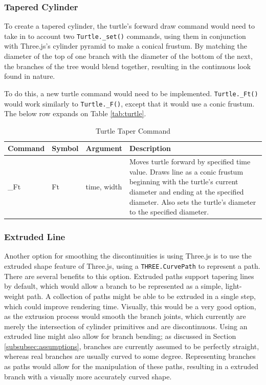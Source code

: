 \documentclass{article}
\newcommand{\tab}{\hspace*{2em}}
\begin{document}
            \subsubsection{Tapered Cylinder}
    \tab To create a tapered cylinder, the turtle's forward draw command would need to take in to
account two \verb|Turtle._set()| commands, using them in conjunction with Three.js's cylinder
pyramid to make a conical frustum. By matching the diameter of the top of one branch with the
diameter of the bottom of the next, the branches of the tree would blend together, resulting in the
continuous look found in nature.

    \tab To do this, a new turtle command would need to be implemented. \verb|Turtle._Ft()| would
work similarly to \verb|Turtle._F()|, except that it would use a conic frustum. The below row
expands on Table \ref{tab:turtle}.
\begin{table}[h]
\centering
\begin{tabular}{|l|l|l|p{7cm}|}
    \hline
    Command & Symbol & Argument & Description \\ \hline \hline
    \_Ft & Ft & time, width & Moves turtle forward by specified time value. Draws line as a conic
frustum beginning with the turtle's current diameter and ending at the specified diameter. Also
sets the turtle's diameter to the specified diameter.\\ \hline
\end{tabular}
\caption[Taper Command]{Turtle Taper Command}
\label{tab:taper}
\end{table}

            \subsubsection{Extruded Line}
    \tab Another option for smoothing the discontinuities is using Three.js is to use the extruded
shape feature of Three.js, using a \verb|THREE.CurvePath| to represent a path. There are several
benefits to this option. Extruded paths support tapering lines by default, which would allow a
branch to be represented as a simple, light-weight path. A collection of paths might be able to be
extruded in a single step, which could improve rendering time. Visually, this would be a very good
option, as the extrusion process would smooth the branch joints, which currently are merely the
intersection of cylinder primitives and are discontinuous. Using an extruded line might also allow
for branch bending; as discussed in Section \ref{subsubsec:assumptions}, branches are currently
assumed to be perfectly straight, whereas real branches are usually curved to some degree.
Representing branches as paths would allow for the manipulation of these paths, resulting in a
extruded branch with a visually more accurately curved shape.
\end{document}
